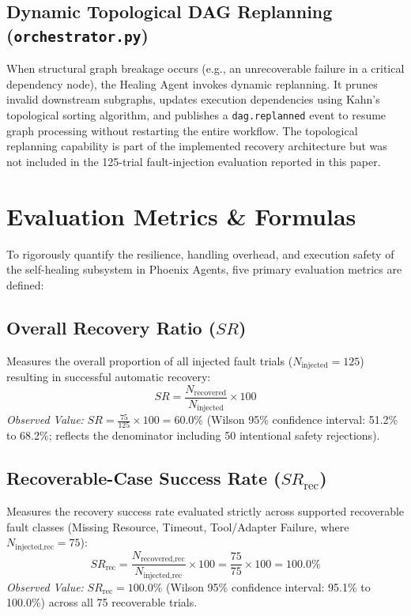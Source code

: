 \documentclass[conference]{IEEEtran}
\begin{document}
\subsection{Dynamic Topological DAG Replanning (\texttt{orchestrator.py})}
When structural graph breakage occurs (e.g., an unrecoverable failure in a critical dependency node), the Healing Agent invokes dynamic replanning. It prunes invalid downstream subgraphs, updates execution dependencies using Kahn's topological sorting algorithm, and publishes a \texttt{dag.replanned} event to resume graph processing without restarting the entire workflow. The topological replanning capability is part of the implemented recovery architecture but was not included in the 125-trial fault-injection evaluation reported in this paper.

\section{Evaluation Metrics \& Formulas}
To rigorously quantify the resilience, handling overhead, and execution safety of the self-healing subsystem in Phoenix Agents, five primary evaluation metrics are defined:

\subsection{Overall Recovery Ratio ($SR$)}
Measures the overall proportion of all injected fault trials ($N_{\text{injected}} = 125$) resulting in successful automatic recovery:
\begin{equation}
SR = \frac{N_{\text{recovered}}}{N_{\text{injected}}} \times 100
\end{equation}
\textit{Observed Value:} $SR = \frac{75}{125} \times 100 = 60.0\%$ (Wilson 95\% confidence interval: 51.2\% to 68.2\%; reflects the denominator including 50 intentional safety rejections).

\subsection{Recoverable-Case Success Rate ($SR_{\text{rec}}$)}
Measures the recovery success rate evaluated strictly across supported recoverable fault classes (Missing Resource, Timeout, Tool/Adapter Failure, where $N_{\text{injected,rec}} = 75$):
\begin{equation}
SR_{\text{rec}} = \frac{N_{\text{recovered,rec}}}{N_{\text{injected,rec}}} \times 100 = \frac{75}{75} \times 100 = 100.0\%
\end{equation}
\textit{Observed Value:} $SR_{\text{rec}} = 100.0\%$ (Wilson 95\% confidence interval: 95.1\% to 100.0\%) across all 75 recoverable trials.
\end{document}
